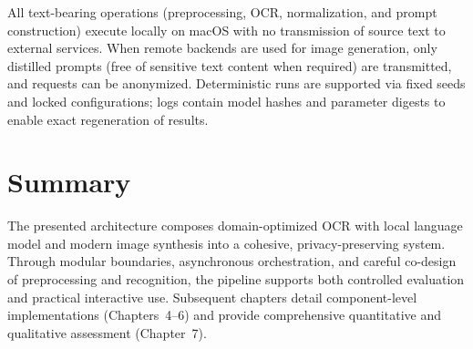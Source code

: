 All text-bearing operations (preprocessing, OCR, normalization, and prompt construction) execute locally on macOS with no transmission of source text to external services. When remote backends are used for image generation, only distilled prompts (free of sensitive text content when required) are transmitted, and requests can be anonymized. Deterministic runs are supported via fixed seeds and locked configurations; logs contain model hashes and parameter digests to enable exact regeneration of results.

\section{Summary}

The presented architecture composes domain-optimized OCR with local language model and modern image synthesis into a cohesive, privacy-preserving system. Through modular boundaries, asynchronous orchestration, and careful co-design of preprocessing and recognition, the pipeline supports both controlled evaluation and practical interactive use. Subsequent chapters detail component-level implementations (Chapters~4--6) and provide comprehensive quantitative and qualitative assessment (Chapter~7).
